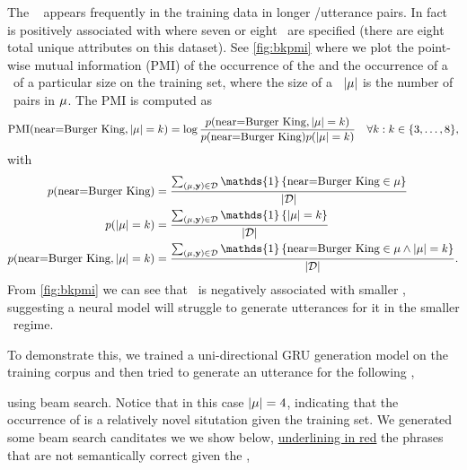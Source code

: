 The \attributevalue~ appears frequently in the training
data in longer \meaningrepresentation/utterance pairs. In fact  is positively associated with \meaningrepresentations where seven or eight \attributes~are specified (there are eight total unique attributes on this
dataset). See \autoref{fig:bkpmi} where we plot the point-wise mutual information
(PMI) \citep{church1990} of the occurrence of the  and the occurrence of a \meaningrepresentation~of a particular size on the training set, where the size of a \meaningrepresentation~${\left\vert \mu \right\vert}$ is the number of \attributevalue~pairs in $\mu$.
The PMI is computed as 
\[\operatorname*{PMI}(\textrm{near=Burger King},  {\left\vert \mu \right\vert} = k) = \log \frac{p(\textrm{near=Burger King}, {\left\vert \mu \right\vert} = k)}{p( \textrm{near=Burger King}  ) p({\left\vert \mu \right\vert} = k)}     \quad \forall k : k \in \{3,\ldots,8\},\]
with \begin{align*}
    p(\AV{near}{Burger King}) &= \frac{\sum_{(\mr,\utttoks) \in \corpus}\mathds{1}\left\{ \AV{near}{Burger King} \in \mr \right\}}{\setsize{\corpus}} \\
    p(\setsize{\mr}=k) &= \frac{\sum_{(\mr,\utttoks) \in \corpus}\mathds{1}\left\{ \setsize{\mr} = k \right\}}{\setsize{\corpus}} \\
    p(\AV{near}{Burger King},\setsize{\mr}=k) &= \frac{\sum_{(\mr,\utttoks) \in \corpus}\mathds{1}\left\{\AV{near}{Burger King} \in \mr \wedge \setsize{\mr} = k \right\}}{\setsize{\corpus}}.
\end{align*}
From \autoref{fig:bkpmi} we can see that ~is negatively
associated with smaller \meaningrepresentations, suggesting a neural
model will struggle to generate utterances for it in the smaller \meaningrepresentation~regime.



To demonstrate this, we trained a uni-directional GRU generation model on the training corpus
and then tried to generate an utterance for the following \meaningrepresentation,
\begin{center}
        {}  
        {}
        {}
        {}\end{center}
using beam search. Notice that in this case ${\left\vert \mu \right\vert}=4$,
indicating that the occurrence of  is a 
relatively novel situtation given
 the training set.
We generated some beam search canditates we we show below, {\color{red}\uline{underlining in red}} the phrases that
are not semantically correct given the \meaningrepresentation,

